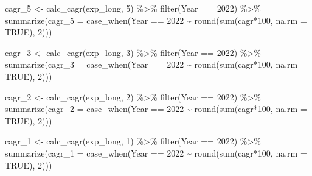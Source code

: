 \documentclass[
  letterpaper,
  DIV=11,
  numbers=noendperiod]{scrreport}
\newenvironment{Shaded}{\begin{snugshade}}{\end{snugshade}}
\newcommand{\AttributeTok}[1]{\textcolor[rgb]{0.40,0.45,0.13}{#1}}
\newcommand{\ConstantTok}[1]{\textcolor[rgb]{0.56,0.35,0.01}{#1}}
\newcommand{\DecValTok}[1]{\textcolor[rgb]{0.68,0.00,0.00}{#1}}
\newcommand{\FunctionTok}[1]{\textcolor[rgb]{0.28,0.35,0.67}{#1}}
\newcommand{\NormalTok}[1]{\textcolor[rgb]{0.00,0.23,0.31}{#1}}
\newcommand{\OtherTok}[1]{\textcolor[rgb]{0.00,0.23,0.31}{#1}}
\newcommand{\SpecialCharTok}[1]{\textcolor[rgb]{0.37,0.37,0.37}{#1}}
\begin{document}
\begin{Shaded}
\begin{Highlighting}[]
\NormalTok{cagr\_5 }\OtherTok{\textless{}{-}} \FunctionTok{calc\_cagr}\NormalTok{(exp\_long, }\DecValTok{5}\NormalTok{) }\SpecialCharTok{\%\textgreater{}\%} 
  \FunctionTok{filter}\NormalTok{(Year }\SpecialCharTok{==} \DecValTok{2022}\NormalTok{) }\SpecialCharTok{\%\textgreater{}\%}
  \FunctionTok{summarize}\NormalTok{(}\AttributeTok{cagr\_5 =} \FunctionTok{case\_when}\NormalTok{(Year }\SpecialCharTok{==} \DecValTok{2022} \SpecialCharTok{\textasciitilde{}} \FunctionTok{round}\NormalTok{(}\FunctionTok{sum}\NormalTok{(cagr}\SpecialCharTok{*}\DecValTok{100}\NormalTok{, }\AttributeTok{na.rm =} \ConstantTok{TRUE}\NormalTok{), }\DecValTok{2}\NormalTok{)))}

\NormalTok{cagr\_3 }\OtherTok{\textless{}{-}} \FunctionTok{calc\_cagr}\NormalTok{(exp\_long, }\DecValTok{3}\NormalTok{) }\SpecialCharTok{\%\textgreater{}\%} 
  \FunctionTok{filter}\NormalTok{(Year }\SpecialCharTok{==} \DecValTok{2022}\NormalTok{) }\SpecialCharTok{\%\textgreater{}\%}
  \FunctionTok{summarize}\NormalTok{(}\AttributeTok{cagr\_3 =} \FunctionTok{case\_when}\NormalTok{(Year }\SpecialCharTok{==} \DecValTok{2022} \SpecialCharTok{\textasciitilde{}} \FunctionTok{round}\NormalTok{(}\FunctionTok{sum}\NormalTok{(cagr}\SpecialCharTok{*}\DecValTok{100}\NormalTok{, }\AttributeTok{na.rm =} \ConstantTok{TRUE}\NormalTok{), }\DecValTok{2}\NormalTok{)))}

\NormalTok{cagr\_2 }\OtherTok{\textless{}{-}} \FunctionTok{calc\_cagr}\NormalTok{(exp\_long, }\DecValTok{2}\NormalTok{) }\SpecialCharTok{\%\textgreater{}\%} 
  \FunctionTok{filter}\NormalTok{(Year }\SpecialCharTok{==} \DecValTok{2022}\NormalTok{) }\SpecialCharTok{\%\textgreater{}\%}
  \FunctionTok{summarize}\NormalTok{(}\AttributeTok{cagr\_2 =} \FunctionTok{case\_when}\NormalTok{(Year }\SpecialCharTok{==} \DecValTok{2022} \SpecialCharTok{\textasciitilde{}} \FunctionTok{round}\NormalTok{(}\FunctionTok{sum}\NormalTok{(cagr}\SpecialCharTok{*}\DecValTok{100}\NormalTok{, }\AttributeTok{na.rm =} \ConstantTok{TRUE}\NormalTok{), }\DecValTok{2}\NormalTok{)))}

\NormalTok{cagr\_1 }\OtherTok{\textless{}{-}} \FunctionTok{calc\_cagr}\NormalTok{(exp\_long, }\DecValTok{1}\NormalTok{) }\SpecialCharTok{\%\textgreater{}\%} 
  \FunctionTok{filter}\NormalTok{(Year }\SpecialCharTok{==} \DecValTok{2022}\NormalTok{) }\SpecialCharTok{\%\textgreater{}\%}
  \FunctionTok{summarize}\NormalTok{(}\AttributeTok{cagr\_1 =} \FunctionTok{case\_when}\NormalTok{(Year }\SpecialCharTok{==} \DecValTok{2022} \SpecialCharTok{\textasciitilde{}} \FunctionTok{round}\NormalTok{(}\FunctionTok{sum}\NormalTok{(cagr}\SpecialCharTok{*}\DecValTok{100}\NormalTok{, }\AttributeTok{na.rm =} \ConstantTok{TRUE}\NormalTok{), }\DecValTok{2}\NormalTok{)))}


\end{Highlighting}
\end{Shaded}
\end{document}
